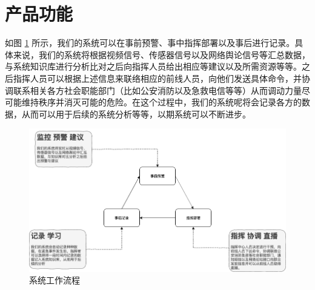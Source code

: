 \documentclass{ctexrep}
\begin{document}
\section{产品功能}
如图 \ref{fig:process} 所示，我们的系统可以在事前预警、事中指挥部署以及事后进行记录。具体来说，我们的系统将根据视频信号、传感器信号以及网络舆论信号等汇总数据，与系统知识库进行分析比对之后向指挥人员给出相应等建议以及所需资源等等。之后指挥人员可以根据上述信息来联络相应的前线人员，向他们发送具体命令，并协调联系相关各方社会职能部门（比如公安消防以及急救电信等等）从而调动力量尽可能维持秩序并消灭可能的危险。在这个过程中，我们的系统呢将会记录各方的数据，从而可以用于后续的系统分析等等，以期系统可以不断进步。
\begin{figure}[H]
	\centering
	\includegraphics[scale=0.3]{img/process.png}
	\caption{\label{fig:process} 系统工作流程}
\end{figure}
\end{document}
